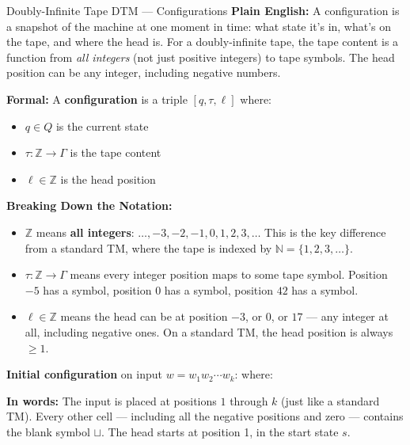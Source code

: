\begin{definitionbox}{{Doubly-Infinite Tape DTM --- Configurations}}
\textbf{Plain English:}
A configuration is a snapshot of the machine at one moment in time: what state
it's in, what's on the tape, and where the head is. For a doubly-infinite
tape, the tape content is a function from \emph{all integers} (not just
positive integers) to tape symbols. The head position can be any integer,
including negative numbers.

\textbf{Formal:}
A \textbf{configuration} is a triple $[q, \tau, \ell]$ where:
\begin{itemize}[nosep]
\item $q \in Q$ is the current state
\item $\tau \colon \mathbb{Z} \to \Gamma$ is the tape content
\item $\ell \in \mathbb{Z}$ is the head position
\end{itemize}

\textbf{Breaking Down the Notation:}
\begin{itemize}[nosep]
\item $\mathbb{Z}$ means \textbf{all integers}: $\ldots, -3, -2, -1, 0, 1, 2, 3, \ldots$ This is the key difference from a standard TM, where the tape is indexed by $\mathbb{N} = \{1, 2, 3, \ldots\}$.
\item $\tau \colon \mathbb{Z} \to \Gamma$ means every integer position maps to some tape symbol. Position $-5$ has a symbol, position $0$ has a symbol, position $42$ has a symbol.
\item $\ell \in \mathbb{Z}$ means the head can be at position $-3$, or $0$, or $17$ --- any integer at all, including negative ones. On a standard TM, the head position is always $\geq 1$.
\end{itemize}

\textbf{Initial configuration} on input $w = w_1 w_2 \cdots w_k$:
\fitmath{[s,\; \tau_0,\; 1]}
where:

\textbf{In words:} The input is placed at positions $1$ through $k$ (just
like a standard TM). Every other cell --- including all the negative
positions and zero --- contains the blank symbol $\sqcup$. The head starts at
position 1, in the start state $s$.
\end{definitionbox}


